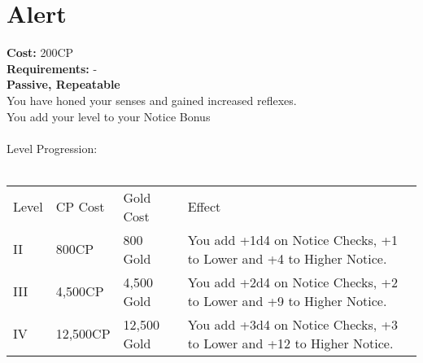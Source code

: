 \section{Alert}\label{perk:alert}
\textbf{Cost:} 200CP\\
\textbf{Requirements:} -\\
\textbf{Passive, Repeatable}\\
You have honed your senses and gained increased reflexes.\\
You add your level to your Notice Bonus\\
\\
Level Progression:\\
\\
\begin{tabular}{l | l | l | l}
	Level & CP Cost & Gold Cost & Effect\\
	II & 800CP & 800 Gold & You add +1d4 on Notice Checks, +1 to Lower and +4 to Higher Notice.\\
	III & 4,500CP & 4,500 Gold & You add +2d4 on Notice Checks, +2 to Lower and +9 to Higher Notice.\\
	IV & 12,500CP & 12,500 Gold & You add +3d4 on Notice Checks, +3 to Lower and +12 to Higher Notice.\\
\end{tabular}
